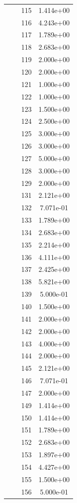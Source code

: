 \documentclass[12pt]{article}
\begin{document}
\begin{longtable}{@{}cccc@{}}
 &  & 115 & 1.414e+00 \\
 &  & 116 & 4.243e+00 \\
 &  & 117 & 1.789e+00 \\
 &  & 118 & 2.683e+00 \\
 &  & 119 & 2.000e+00 \\
 &  & 120 & 2.000e+00 \\
 &  & 121 & 1.000e+00 \\
 &  & 122 & 1.000e+00 \\
 &  & 123 & 1.500e+00 \\
 &  & 124 & 2.500e+00 \\
 &  & 125 & 3.000e+00 \\
 &  & 126 & 3.000e+00 \\
 &  & 127 & 5.000e+00 \\
 &  & 128 & 3.000e+00 \\
 &  & 129 & 2.000e+00 \\
 &  & 131 & 2.121e+00 \\
 &  & 132 & 7.071e-01 \\
 &  & 133 & 1.789e+00 \\
 &  & 134 & 2.683e+00 \\
 &  & 135 & 2.214e+00 \\
 &  & 136 & 4.111e+00 \\
 &  & 137 & 2.425e+00 \\
 &  & 138 & 5.821e+00 \\
 &  & 139 & 5.000e-01 \\
 &  & 140 & 1.500e+00 \\
 &  & 141 & 2.000e+00 \\
 &  & 142 & 2.000e+00 \\
 &  & 143 & 4.000e+00 \\
 &  & 144 & 2.000e+00 \\
 &  & 145 & 2.121e+00 \\
 &  & 146 & 7.071e-01 \\
 &  & 147 & 2.000e+00 \\
 &  & 149 & 1.414e+00 \\
 &  & 150 & 1.414e+00 \\
 &  & 151 & 1.789e+00 \\
 &  & 152 & 2.683e+00 \\
 &  & 153 & 1.897e+00 \\
 &  & 154 & 4.427e+00 \\
 &  & 155 & 1.500e+00 \\
 &  & 156 & 5.000e-01 \\

\end{longtable}
\end{document}
